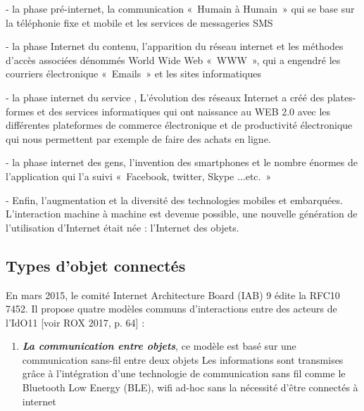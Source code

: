 \documentclass[12pt,a4paper]{report}
\begin{document}
\begin{flushleft}
\begin{figure}[H]
	\end{figure}
	
	
	\noindent 
	
	- la phase pr\'{e}-internet, la communication «~Humain \`{a} Humain~» qui se base sur la t\'{e}l\'{e}phonie fixe et mobile et les services de messageries SMS
	
	- la phase Internet du contenu, l'apparition du r\'{e}seau internet et les m\'{e}thodes d'acc\`{e}s associ\'{e}es d\'{e}nomm\'{e}s World Wide Web «~WWW~», qui a engendr\'{e} les courriers \'{e}lectronique «~Emails~» et les sites informatiques 
	
	\noindent 
	
	- la phase internet du service , L'\'{e}volution des r\'{e}seaux Internet a cr\'{e}\'{e} des plates-formes et des services informatiques qui ont naissance au WEB 2.0 avec les diff\'{e}rentes plateformes de commerce \'{e}lectronique et de productivit\'{e} \'{e}lectronique qui nous permettent par exemple de faire des achats en ligne.
	
	\noindent 
	
	- la phase internet des gens, l'invention des smartphones et le nombre \'{e}normes de l'application qui l'a suivi «~Facebook, twitter, Skype ...etc.~»
	
	\noindent 
	
	- Enfin, l'augmentation et la diversit\'{e} des technologies mobiles et embarqu\'{e}es. L'interaction machine \`{a} machine est devenue possible, une nouvelle g\'{e}n\'{e}ration de l'utilisation d'Internet \'{e}tait n\'{e}e : l'Internet des objets. 
	
	\noindent 
	
	\subsection{Types d'objet connect\'{e}s }
	
	\noindent 
	
	En mars 2015, le comit\'{e} Internet Architecture Board (IAB) 9 \'{e}dite la RFC10 7452. Il propose quatre mod\`{e}les communs d'interactions entre des acteurs de l'IdO11 [voir ROX 2017, p. 64] :
	
	\noindent 
\end{flushleft}

\begin{enumerate}
	\item  \textbf{\textit{La communication entre objets}}, ce mod\`{e}le est bas\'{e} sur une communication sans-fil entre deux objets Les informations sont transmises gr\^{a}ce \`{a} l'int\'{e}gration d'une technologie de communication sans fil comme le Bluetooth Low Energy (BLE), wifi ad-hoc sans la n\'{e}cessit\'{e} d'\^{e}tre connect\'{e}s \`{a} internet
\end{enumerate}
\end{document}
